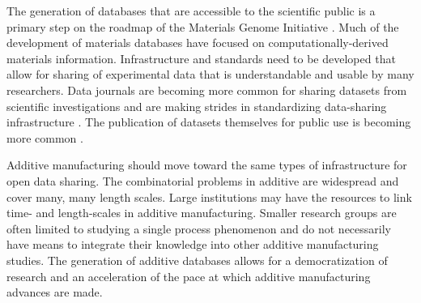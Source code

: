 The generation of databases that are accessible to the scientific public is a primary step on the roadmap of the Materials Genome Initiative \cite{DePablo2014}. Much of the development of materials databases have focused on computationally-derived materials information. Infrastructure and standards need to be developed that allow for sharing of experimental data that is understandable and usable by many researchers. Data journals are becoming more common for sharing datasets from scientific investigations and are making strides in standardizing data-sharing infrastructure \cite{Wilkinson2016}. The publication of datasets themselves for public use is becoming more common \cite{DeJong2015, Kim2017}. 

Additive manufacturing should move toward the same types of infrastructure for open data sharing. The combinatorial problems in additive are widespread and cover many, many length scales. Large institutions may have the resources to link time- and length-scales in additive manufacturing. Smaller research groups are often limited to studying a single process phenomenon and do not necessarily have means to integrate their knowledge into other additive manufacturing studies. The generation of additive databases allows for a democratization of research and an acceleration of the pace at which additive manufacturing advances are made. 